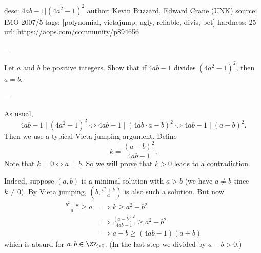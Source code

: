 desc:  $4ab-1 | (4a^2-1)^2$
author: Kevin Buzzard, Edward Crane (UNK)
source:  IMO 2007/5
tags:  [polynomial, vietajump, ugly, reliable, divis, bet]
hardness: 25
url: https://aops.com/community/p894656

---

Let $a$ and $b$ be positive integers.
Show that if $4ab - 1$ divides $(4a^{2} - 1)^{2}$, then $a = b$.

---

As usual,
\[ 4ab-1 \mid (4a^2-1)^2 \iff 4ab-1 \mid (4ab \cdot a-b)^2
  \iff 4ab-1 \mid (a-b)^2. \]
Then we use a typical Vieta jumping argument.
Define \[ k = \frac{(a-b)^2}{4ab-1}. \]
Note that $k = 0 \iff a = b$.
So we will prove that $k > 0$ leads to a contradiction.

Indeed, suppose $(a, b)$ is a minimal solution with $a > b$
(we have $a \neq b$ since $k \neq 0$).
By Vieta jumping, $(b, \frac{b^2+k}{a})$ is also such a solution.
But now
\begin{align*}
  \frac{b^2+k}{a} \ge a &\implies k \ge a^2 - b^2 \\
  &\implies \frac{(a-b)^2}{4ab-1} \ge a^2-b^2 \\
  &\implies a-b \ge (4ab-1)(a+b)
\end{align*}
which is absurd for $a,b \in \ZZ_{>0}$.
(In the last step we divided by $a-b > 0$.)
